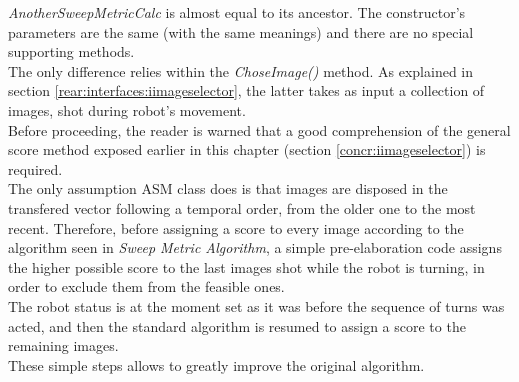 \textit{AnotherSweepMetricCalc} is almost equal to its ancestor. The
constructor's parameters are the same (with the same meanings)
and there are no special supporting methods.
\\
The only difference relies within the \textit{ChoseImage()} method. As
explained in section \ref{rear:interfaces:iimageselector}, the latter
takes as input a collection of images, shot during robot's movement.
\\
Before proceeding, the reader is warned that a good comprehension
of the general score method exposed earlier in this chapter
(section \ref{concr:iimageselector}) is required.
\\
The only assumption ASM class does is that images are disposed in
the transfered vector following a temporal order, from the older one
to the most recent. Therefore, before assigning a score
to every image according to the algorithm seen in \textit{Sweep Metric 
Algorithm}, a simple pre-elaboration code assigns the higher
possible score to the last images shot while the robot is turning,
in order to exclude them from the feasible ones.
\\
The robot status is at the moment set
as it was before the sequence of turns was acted, and then the 
standard algorithm is resumed to assign a score
to the remaining images.
\\
These simple steps allows to greatly improve the original algorithm. 
